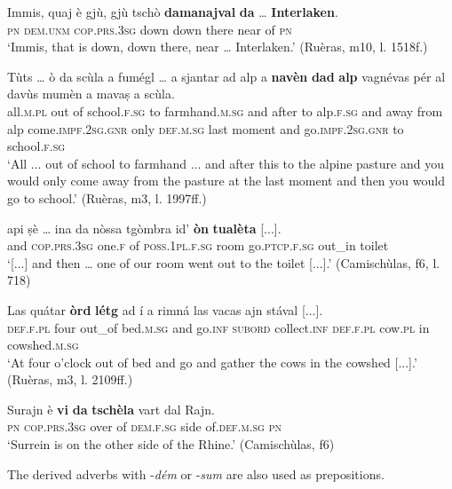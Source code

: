 \gll  Immis, quaj è gjù, gjù tschò \textbf{damanajval} \textbf{da} … \textbf{Interlaken}.\\
\textsc{pn} \textsc{dem.unm} \textsc{cop.prs.3sg} down down there near of {} \textsc{pn} \\
\glt `Immis, that is down, down there, near … Interlaken.' (Ruèras, m10, l. 1518f.)
\z

\ea

\gll  Tùts … ò da scùla a fumégl … a sjantar ad alp a \textbf{navèn} \textbf{dad} \textbf{alp} vagnévas pér al davùs mumèn a mavaṣ a scùla. \\
all.\textsc{m.pl} {} out of school.\textsc{f.sg} to farmhand.\textsc{m.sg} {} and after to alp.\textsc{f.sg} and away from alp come.\textsc{impf.2sg.gnr} only \textsc{def.m.sg} last moment and go.\textsc{impf.2sg.gnr} to school.\textsc{f.sg}\\
\glt `All ... out of school to farmhand ... and after this to the alpine pasture and you would only come away from the pasture at the last moment and then you would go to school.' (Ruèras, m3, l. 1997ff.)
\z

\ea

\gll    [...] api ṣè …  ina da nòssa tgòmbra id’ \textbf{òn} \textbf{tualèta} [...].\\
{} and \textsc{cop.prs.3sg} {} one.\textsc{f} of \textsc{poss.1pl.f.sg} room go.\textsc{ptcp.f.sg} out\_in toilet\\
\glt `[...] and then … one of our room went out to the toilet [...].' (Camischùlas, f6, l. 718)
\z

\ea

\gll Las quátar \textbf{òrd} \textbf{létg} ad í a rimná las vacas ajn stával [...].\\
\textsc{def.f.pl} four out\_of bed.\textsc{m.sg} and go.\textsc{inf} \textsc{subord} collect.\textsc{inf} \textsc{def.f.pl} cow.\textsc{pl} in cowshed.\textsc{m.sg}\\
\glt `At four o'clock out of bed and go and gather the cows in the cowshed [...].' (Ruèras, m3, l. 2109ff.)
\z

\ea

\gll Surajn è \textbf{vi} \textbf{da} \textbf{tschèla} vart dal Rajn.\\
\textsc{pn} \textsc{cop.prs.3sg} over of \textsc{dem.f.sg} side of.\textsc{def.m.sg} \textsc{pn} \\
\glt `Surrein is on the other side of the Rhine.' (Camischùlas, f6)
\z

The derived adverbs with -\textit{dém} or -\textit{sum} are also used as prepositions.

